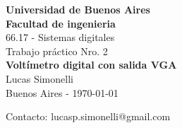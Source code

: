\begin{center}

{\bf{\Huge Universidad de Buenos Aires}}\\[0.5cm]
{\bf{\Huge Facultad de ingenieria}}\\[0.3cm]

{\LARGE 66.17 - Sistemas digitales}\\[1.25cm]
{\Large }Trabajo práctico Nro. 2\\[2.3cm]
{\LARGE {\bf Voltímetro digital con salida VGA}}\\[3.5cm]
{\large Lucas Simonelli}\\[2cm]
Buenos Aires - \today
\\[5.2cm]

\end{center}

{Contacto: lucasp.simonelli@gmail.com}\\[2cm]
\thispagestyle{empty}   %